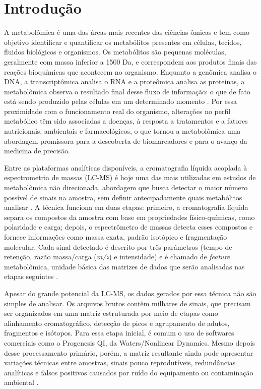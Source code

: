 % 

\chapter[Introdução]{Introdução}

A metabolômica é uma das áreas mais recentes das ciências ômicas e tem como objetivo identificar e quantificar os metabólitos presentes em células, tecidos, fluidos biológicos e organismos. Os metabólitos são pequenas moléculas, geralmente com massa inferior a 1500 Da, e correspondem aos produtos finais das reações bioquímicas que acontecem no organismo. Enquanto a genômica analisa o DNA, a transcriptômica analisa o RNA e a proteômica analisa as proteínas, a metabolômica observa o resultado final desse fluxo de informação: o que de fato está sendo produzido pelas células em um determinado momento \cite{qiu2023small}. Por essa proximidade com o funcionamento real do organismo, alterações no perfil metabólico têm sido associadas a doenças, à resposta a tratamentos e a fatores nutricionais, ambientais e farmacológicos, o que tornou a metabolômica uma abordagem promissora para a descoberta de biomarcadores e para o avanço da medicina de precisão.
 
Entre as plataformas analíticas disponíveis, a cromatografia líquida acoplada à espectrometria de massas (LC-MS) é hoje uma das mais utilizadas em estudos de metabolômica não direcionada, abordagem que busca detectar o maior número possível de sinais na amostra, sem definir antecipadamente quais metabólitos analisar \cite{schrimpe2016untargeted}. A técnica funciona em duas etapas: primeiro, a cromatografia líquida separa os compostos da amostra com base em propriedades físico-químicas, como polaridade e carga; depois, o espectrômetro de massas detecta esses compostos e fornece informações como massa exata, padrão isotópico e fragmentação molecular. Cada sinal detectado é descrito por três parâmetros (tempo de retenção, razão massa/carga (\textit{m/z}) e intensidade) e é chamado de \textit{feature} metabolômica, unidade básica das matrizes de dados que serão analisadas nas etapas seguintes \cite{chen2022guide}.
 
Apesar do grande potencial da LC-MS, os dados gerados por essa técnica não são simples de analisar. Os arquivos brutos contêm milhares de sinais, que precisam ser organizados em uma matriz estruturada por meio de etapas como alinhamento cromatográfico, detecção de picos e agrupamento de adutos, fragmentos e isótopos. Para essa etapa inicial, é comum o uso de softwares comerciais como o Progenesis QI, da Waters/Nonlinear Dynamics. Mesmo depois desse processamento primário, porém, a matriz resultante ainda pode apresentar variações técnicas entre amostras, sinais pouco reprodutíveis, redundâncias analíticas e falsos positivos causados por ruído do equipamento ou contaminação ambiental \cite{schiffman2019filtering}.
 
